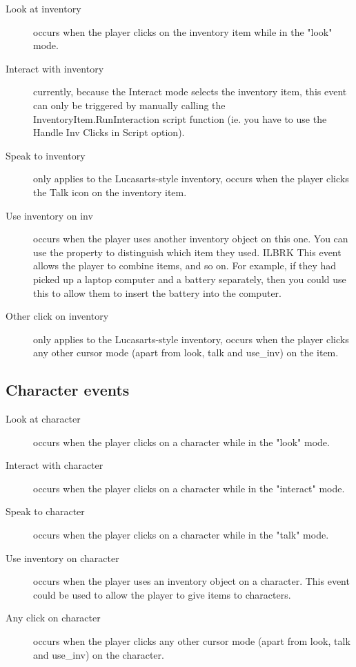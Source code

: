 \begin{description}
\item [Look at inventory] occurs when the player clicks on the inventory item
while in the "look" mode.
\item [Interact with inventory] currently, because the Interact mode selects the
inventory item, this event can only be triggered by manually calling
the InventoryItem.RunInteraction script function (ie. you have to use the Handle
Inv Clicks in Script option).
\item [Speak to inventory] only applies to the Lucasarts-style inventory,
occurs when the player clicks the Talk icon on the inventory item.
\item [Use inventory on inv] occurs when the player uses another inventory
object on this one. You can use the 
property to distinguish which item they used. ILBRK
This event allows the player to combine items, and so on. For example, if they had
picked up a laptop computer and a battery separately, then you could use this to
allow them to insert the battery into the computer.
\item [Other click on inventory] only applies to the Lucasarts-style inventory,
occurs when the player clicks any other cursor mode (apart from look, talk
and use_inv) on the item.
\end{description}

\subsection{Character events}%

\begin{description}
\item [Look at character] occurs when the player clicks on a character while in the "look" mode.
\item [Interact with character] occurs when the player clicks on a character while in the "interact" mode.
\item [Speak to character] occurs when the player clicks on a character while in the "talk" mode.
\item [Use inventory on character] occurs when the player uses an inventory
object on a character.  This event could be used to allow the player to give items to characters.
\item [Any click on character] occurs when the player clicks any other cursor mode (apart from look, talk and use_inv) on the character.
\end{description}

